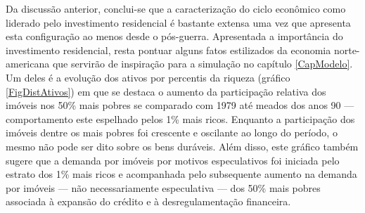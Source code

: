 Da discussão anterior, conclui-se que a caracterização do ciclo econômico como liderado pelo investimento residencial é bastante extensa uma vez que apresenta esta configuração ao menos desde o pós-guerra.
Apresentada a importância do investimento residencial, resta pontuar alguns fatos estilizados da economia norte-americana que servirão de inspiração para a simulação no capítulo \ref{CapModelo}. 
Um deles é a evolução dos ativos por percentis da riqueza (gráfico \ref{FigDistAtivos}) em que se destaca o aumento da participação relativa dos imóveis
nos 50\% mais pobres se comparado com 1979 até meados dos anos 90 ---  comportamento este espelhado pelos 1\% mais ricos. 
Enquanto a participação dos imóveis dentre os mais pobres foi crescente e oscilante ao longo do período, o mesmo não pode ser dito sobre os bens duráveis.
Além disso, este gráfico também sugere que a demanda por imóveis por motivos especulativos foi iniciada pelo estrato dos 1\% mais ricos e acompanhada pelo subsequente aumento na demanda por imóveis --- não necessariamente especulativa --- dos 50\% mais pobres associada à expansão do crédito e à desregulamentação financeira.






